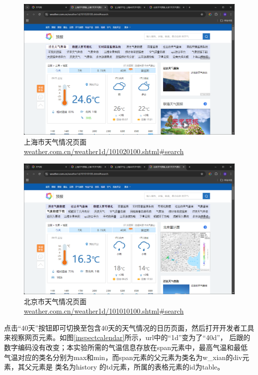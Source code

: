 \begin{figure}[!htbp]
    \centering
    \includegraphics[width=\textwidth]{figures/shanghai_homepage.png}
    \caption{上海市天气情况页面\url{weather.com.cn/weather1d/101020100.shtml\#search}}\label{shanghaihomepage}
\end{figure}

\begin{figure}[!htbp]
    \centering
    \includegraphics[width=\textwidth]{figures/beijing_homepage.png}
    \caption{北京市天气情况页面\url{weather.com.cn/weather1d/101010100.shtml\#search}}\label{beijinghomepage}
\end{figure}

点击“40天”按钮即可切换至包含40天的天气情况的日历页面，然后打开开发者工具来视察网页元素。如图\ref{inspectcalendar}所示，url中的“1d”变为了“40d”，
后跟的数字编码没有改变；本实验所需的气温信息存放在span元素中，最高气温和最低气温对应的类名分别为max和min，而span元素的父元素为类名为w\_xian的div元素，其父元素是
类名为history  的td元素，所属的表格元素的id为table。

